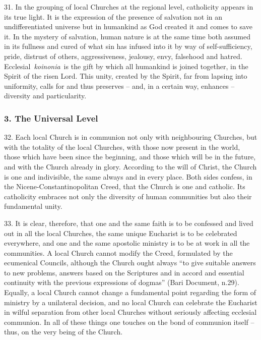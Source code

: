 31. In the grouping of local Churches at the regional level, catholicity
appears in its true light. It is the expression of the presence of
salvation not in an undifferentiated universe but in humankind as God
created it and comes to save it. In the mystery of salvation, human
nature is at the same time both assumed in its fullness and cured of
what sin has infused into it by way of self-sufficiency, pride, distrust
of others, aggressiveness, jealousy, envy, falsehood and hatred.
Ecclesial~\emph{koinonia}~is the gift by which all humankind is joined
together, in the Spirit of the risen Lord. This unity, created by the
Spirit, far from lapsing into uniformity, calls for and thus preserves
-- and, in a certain way, enhances -- diversity and particularity.

\subsubsection{3. The Universal Level}\label{the-universal-level}

32. Each local Church is in communion not only with neighbouring
Churches, but with the totality of the local Churches, with those now
present in the world, those which have been since the beginning, and
those which will be in the future, and with the Church already in glory.
According to the will of Christ, the Church is one and indivisible, the
same always and in every place. Both sides confess, in the
Nicene-Constantinopolitan Creed, that the Church is one and catholic.
Its catholicity embraces not only the diversity of human communities but
also their fundamental unity.

33. It is clear, therefore, that one and the same faith is to be
confessed and lived out in all the local Churches, the same unique
Eucharist is to be celebrated everywhere, and one and the same apostolic
ministry is to be at work in all the communities. A local Church cannot
modify the Creed, formulated by the ecumenical Councils, although the
Church ought always ``to give suitable answers to new problems, answers
based on the Scriptures and in accord and essential continuity with the
previous expressions of dogmas'' (Bari Document, n.29). Equally, a local
Church cannot change a fundamental point regarding the form of ministry
by a unilateral decision, and no local Church can celebrate the
Eucharist in wilful separation from other local Churches without
seriously affecting ecclesial communion. In all of these things one
touches on the bond of communion itself -- thus, on the very being of
the Church.

